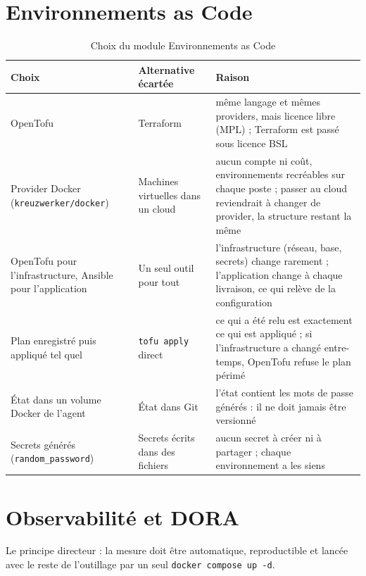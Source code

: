 \documentclass[11pt,a4paper]{report}
\begin{document}
\section{Environnements as Code}
\begin{table}[H]
  \centering
  \small
  \begin{tabularx}{\textwidth}{@{}L{3cm}L{3cm}Y@{}}
    \toprule
    \textbf{Choix} & \textbf{Alternative écartée} & \textbf{Raison} \\
    \midrule
    OpenTofu & Terraform & même langage et mêmes providers, mais licence libre (MPL) ; Terraform est passé sous licence BSL \\
    \addlinespace
    Provider Docker (\texttt{kreuzwerker/\allowbreak docker}) & Machines virtuelles dans un cloud & aucun compte ni coût, environnements recréables sur chaque poste ; passer au cloud reviendrait à changer de provider, la structure restant la même \\
    \addlinespace
    OpenTofu pour l'infrastructure, Ansible pour l'application & Un seul outil pour tout & l'infrastructure (réseau, base, secrets) change rarement ; l'application change à chaque livraison, ce qui relève de la configuration \\
    \addlinespace
    Plan enregistré puis appliqué tel quel & \texttt{tofu apply} direct & ce qui a été relu est exactement ce qui est appliqué ; si l'infrastructure a changé entre-temps, OpenTofu refuse le plan périmé \\
    \addlinespace
    État dans un volume Docker de l'agent & État dans Git & l'état contient les mots de passe générés : il ne doit jamais être versionné \\
    \addlinespace
    Secrets générés (\texttt{random\_\allowbreak password}) & Secrets écrits dans des fichiers & aucun secret à créer ni à partager ; chaque environnement a les siens \\
    \bottomrule
  \end{tabularx}
  \caption{Choix du module Environnements as Code}
\end{table}

\section{Observabilité et DORA}
Le principe directeur : la mesure doit être automatique, reproductible et lancée avec le reste de l'outillage par un seul \texttt{docker compose up -d}.
\end{document}
